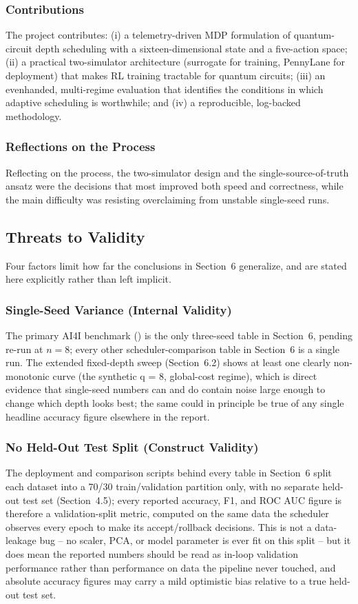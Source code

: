 \subsubsection{Contributions}
The project contributes: (i) a telemetry-driven MDP formulation of quantum-circuit depth scheduling with a sixteen-dimensional state and a five-action space; (ii) a practical two-simulator architecture (surrogate for training, PennyLane for deployment) that makes RL training tractable for quantum circuits; (iii) an evenhanded, multi-regime evaluation that identifies the conditions in which adaptive scheduling is worthwhile; and (iv) a reproducible, log-backed methodology.

\subsubsection{Reflections on the Process}
Reflecting on the process, the two-simulator design and the single-source-of-truth ansatz were the decisions that most improved both speed and correctness, while the main difficulty was resisting overclaiming from unstable single-seed runs.

\subsection{Threats to Validity}
Four factors limit how far the conclusions in Section~6 generalize, and are stated here explicitly rather than left implicit.

\subsubsection{Single-Seed Variance (Internal Validity)}
The primary AI4I benchmark () is the only three-seed table in Section~6, pending re-run at $n=8$; every other scheduler-comparison table in Section~6 is a single run. The extended fixed-depth sweep (Section~6.2) shows at least one clearly non-monotonic curve (the synthetic q = 8, global-cost regime), which is direct evidence that single-seed numbers can and do contain noise large enough to change which depth looks best; the same could in principle be true of any single headline accuracy figure elsewhere in the report.

\subsubsection{No Held-Out Test Split (Construct Validity)}
The deployment and comparison scripts behind every table in Section~6 split each dataset into a 70/30 train/validation partition only, with no separate held-out test set (Section~4.5); every reported accuracy, F1, and ROC AUC figure is therefore a validation-split metric, computed on the same data the scheduler observes every epoch to make its accept/rollback decisions. This is not a data-leakage bug -- no scaler, PCA, or model parameter is ever fit on this split -- but it does mean the reported numbers should be read as in-loop validation performance rather than performance on data the pipeline never touched, and absolute accuracy figures may carry a mild optimistic bias relative to a true held-out test set.

